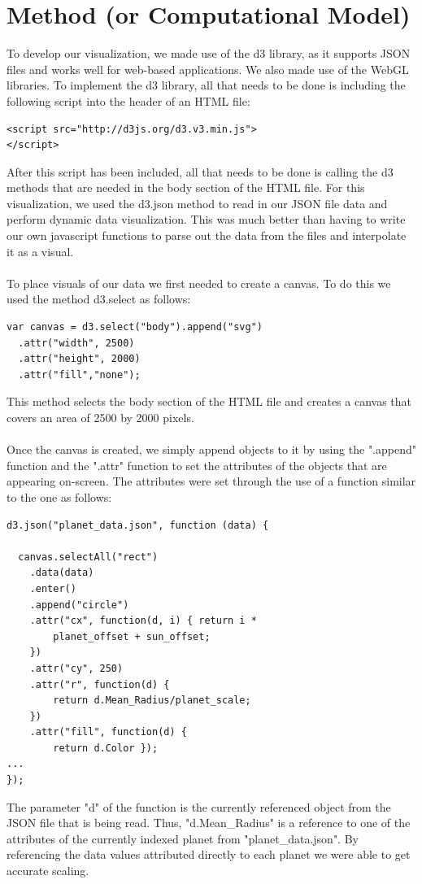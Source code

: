 \documentclass[journal]{vgtc}                %
\begin{document}
\section{Method (or Computational Model)}
To develop our visualization, we made use of the d3 library, as it supports JSON files and works well for web-based applications.
We also made use of the WebGL libraries. 
To implement the d3 library, all that needs to be done is including the following script into the header of an HTML file:
\begin{lstlisting}[frame=single]
<script src="http://d3js.org/d3.v3.min.js">
</script>
\end{lstlisting}
After this script has been included, all that needs to be done is calling the d3 methods that are needed in the body section of the HTML file.
For this visualization, we used the d3.json method to read in our JSON file data and perform dynamic data visualization. This was much better than having to write our own javascript functions to parse out the data from the files and interpolate it as a visual.
\\\\
To place visuals of our data we first needed to create a canvas. To do this we used the method d3.select as follows:
\begin{lstlisting}[frame=single]
var canvas = d3.select("body").append("svg")
  .attr("width", 2500)
  .attr("height", 2000)
  .attr("fill","none");
\end{lstlisting}
This method selects the body section of the HTML file and creates a canvas that covers an area of 2500 by 2000 pixels.
\\\\
Once the canvas is created, we simply append objects to it by using the ".append" function and the ".attr" function to set the attributes of the objects that are appearing on-screen. The attributes were set through the use of a function similar to the one as follows:\\
\begin{lstlisting}[frame=single]
d3.json("planet_data.json", function (data) {
				
  canvas.selectAll("rect")
    .data(data)
    .enter()
    .append("circle")
    .attr("cx", function(d, i) { return i * 
    	planet_offset + sun_offset;
    })
    .attr("cy", 250)
    .attr("r", function(d) { 
    	return d.Mean_Radius/planet_scale; 
    })
    .attr("fill", function(d) { 
    	return d.Color });
...
});
\end{lstlisting}
The parameter "d" of the function is the currently referenced object from the JSON file that is being read. Thus, "d.Mean\_Radius" is a reference to one of the attributes of the currently indexed planet from "planet\_data.json". By referencing the data values attributed directly to each planet we were able to get accurate scaling.
\end{document}
